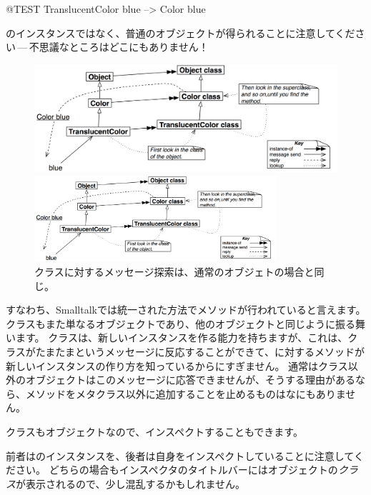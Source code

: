 \documentclass[a4paper,10pt,twoside]{book}
\begin{document}
\begin{code}{@TEST}
TranslucentColor blue --> Color blue
\end{code}
\noindent
{}のインスタンスではなく、普通のオブジェクトが得られることに注意してください\,---\,不思議なところはどこにもありません！

\begin{center}
\begin{figure}[!ht]
\ifluluelse
	{\centerline {\includegraphics[width=\textwidth]{TranslucentColorBlue}}}
	{\centerline {\includegraphics[width=0.8\textwidth]{TranslucentColorBlue}}}
\caption{クラスに対するメッセージ探索は、通常のオブジェトの場合と同じ。}
\end{figure}
\end{center}

すなわち、Smalltalkでは統一された方法でメソッドが行われていると言えます。クラスもまた単なるオブジェクトであり、他のオブジェクトと同じように振る舞います。
クラスは、新しいインスタンスを作る能力を持ちますが、これは、クラスがたまたまというメッセージに反応することができて、に対するメソッドが新しいインスタンスの作り方を知っているからにすぎません。
通常はクラス以外のオブジェクトはこのメッセージに応答できませんが、そうする理由があるなら、メソッドをメタクラス以外に追加することを止めるものはなにもありません。

クラスもオブジェクトなので、インスペクトすることもできます。


\noindent
前者はのインスタンスを、後者は自身をインスペクトしていることに注意してください。
どちらの場合もインスペクタのタイトルバーにはオブジェクトの\emph{クラス}が表示されるので、少し混乱するかもしれません。
\end{document}
